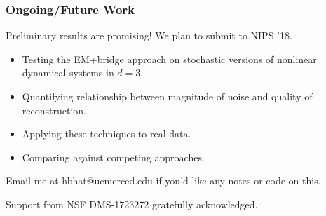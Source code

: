 \documentclass{beamer}
\begin{document}
\begin{frame}
\frametitle{Ongoing/Future Work}
Preliminary results are promising!  We plan to submit to NIPS '18.\smallskip
\begin{itemize}
\item Testing the EM+bridge approach on stochastic versions of nonlinear dynamical systems in $d=3$.
\item Quantifying relationship between magnitude of noise and quality of reconstruction.
\item Applying these techniques to real data.
\item Comparing against competing approaches.
\end{itemize}
Email me at hbhat@ucmerced.edu if you'd like any notes or code on this.\bigskip

Support from NSF DMS-1723272 gratefully acknowledged.
\end{frame}
\end{document}
